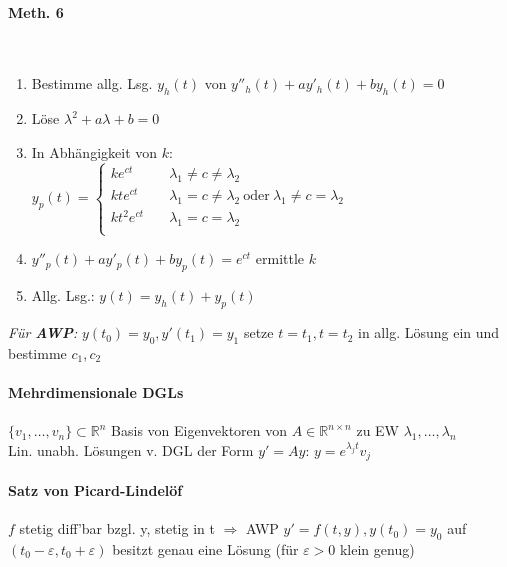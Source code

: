 \documentclass[paper=a3,paper=landscape, fontsize=9pt, DIV=30]{scrartcl}
\newcommand{\real}{{\mathbb{R}}}
\begin{document}
\begin{multicols*}{4}
    \paragraph{Meth. 6}\hspace{0pt}\\
    \begin{enumerate}
    	\item Bestimme allg. Lsg. $y_h(t)$ von $y''_h(t)+ay'_h(t)+by_h(t)=0$
    \item Löse $\lambda^2+a\lambda+b=0$
    \item In Abhängigkeit von $k$:\\$y_p(t) =
    \begin{cases}
    ke^{ct}    & \quad \lambda_1 \neq c \neq \lambda_2 \\
    kte^{ct}   & \quad \lambda_1 = c \neq \lambda_2 \ \text{oder}\ \lambda_1 \neq c = \lambda_2 \\
    kt^2e^{ct} & \quad  \lambda_1 = c = \lambda_2 \\
    \end{cases}
    $
    \item $y''_p(t)+ay'_p(t)+by_p(t)=e^{ct}$
    ermittle $k$
    \item Allg. Lsg.: $y(t)=y_h(t)+y_p(t)$
    \end{enumerate}
	\textit{Für \textbf{AWP}:} $y(t_0)=y_0, y'(t_1)=y_1$ setze $t=t_1, t=t_2$ in allg. Lösung ein und bestimme $c_1,c_2$

  \paragraph{Mehrdimensionale DGLs}
  $\{v_1, \dots, v_n\} \subset \real^n$ Basis von Eigenvektoren von $A \in \real^{n\times n}$ zu EW $\lambda_1, \dots, \lambda_n$\\
  Lin. unabh. Lösungen v. DGL der Form $y'=Ay$: $y=e^{\lambda_jt}v_j$

  \paragraph{Satz von Picard-Lindelöf}
  $f$ stetig diff'bar bzgl. y, stetig in t $\Rightarrow$ AWP $y'=f(t,y), y(t_0)=y_0$ auf $(t_0-\varepsilon, t_0+\varepsilon)$ besitzt genau eine Lösung (für $\varepsilon > 0$ klein genug)

\end{multicols*}
\end{document}
